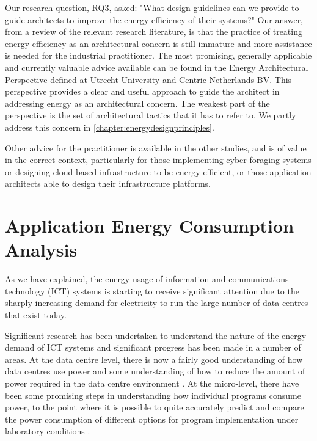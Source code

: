 Our research question, RQ3, asked: "What design guidelines can we provide to guide architects to improve the energy efficiency of their systems?"  Our answer, from a review of the relevant research literature, is that the practice of treating energy efficiency as an architectural concern is still immature and more assistance is needed for the industrial practitioner.  The most promising, generally applicable and currently valuable advice available can be found in the Energy Architectural Perspective defined at Utrecht University and Centric Netherlands BV.  This perspective provides a clear and useful approach to guide the architect in addressing energy as an architectural concern.  The weakest part of the perspective is the set of architectural tactics that it has to refer to.  We partly address this concern in \cref{chapter:energydesignprinciples}.

Other advice for the practitioner is available in the other studies, and is of value in the correct context, particularly for those implementing cyber-foraging systems or designing cloud-based infrastructure to be energy efficient, or those application architects able to design their infrastructure platforms.

\section{Application Energy Consumption Analysis} \label{sec:litreviewenergy}

As we have explained, the energy usage of information and communications technology (ICT) systems is starting to receive significant attention due to the sharply increasing demand for electricity to run the large number of data centres that exist today.

Significant research has been undertaken to understand the nature of the energy demand of ICT systems and significant progress has been made in a number of areas.  At the data centre level, there is now a fairly good understanding of how data centres use power and some understanding of how to reduce the amount of power required in the data centre environment \cite{dc4cities2014_dcmetrics, dayarathna2016-dcenergy}.  At the micro-level, there have been some promising steps in understanding how individual programs consume power, to the point where it is possible to quite accurately predict and compare the power consumption of different options for program implementation under laboratory conditions \cite{bourdon2013-powerapi, noureddine2012-hotspots, islam2016-energysoftwarefeatures, acar2016-beyondcpu}.

